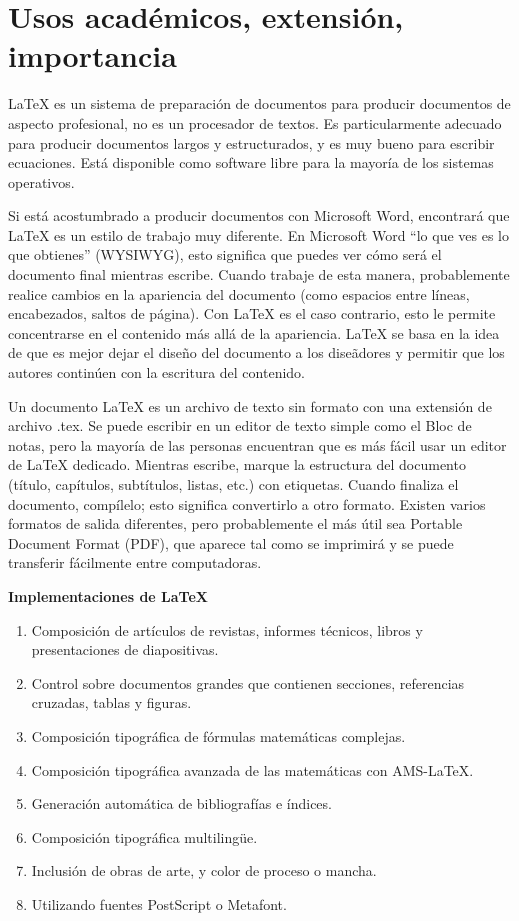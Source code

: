 \documentclass[letterpaper, 10pt, journal]{IEEEtran}
\begin{document}
\section{Usos acad\'emicos, extensi\'on, importancia}
\LaTeX{} es un sistema de preparaci\'on de documentos para producir documentos de aspecto profesional, no es un procesador de textos. Es particularmente adecuado para producir documentos largos y estructurados, y es muy bueno para escribir ecuaciones. Est\'a disponible como software libre para la mayor\'ia de los sistemas operativos.

Si est\'a acostumbrado a producir documentos con Microsoft Word, encontrar\'a que \LaTeX{} es un estilo de trabajo muy diferente. En Microsoft Word \textquotedblleft{}lo que ves es lo que obtienes\textquotedblright{} (WYSIWYG), esto significa que puedes ver c\'omo ser\'a el documento final mientras escribe. Cuando trabaje de esta manera, probablemente realice cambios en la apariencia del documento (como espacios entre l\'ineas, encabezados, saltos de p\'agina). Con \LaTeX{} es el caso contrario, esto le permite concentrarse en el contenido m\'as all\'a de la apariencia. \LaTeX{} se basa en la idea de que es mejor dejar el diseño del documento a los dise\~{a}dores y permitir que los autores contin\'{u}en con la escritura del contenido. \cite{[2]}

Un documento \LaTeX{} es un archivo de texto sin formato con una extensi\'on de archivo .tex. Se puede escribir en un editor de texto simple como el Bloc de notas, pero la mayor\'ia de las personas encuentran que es m\'as f\'acil usar un editor de \LaTeX{} dedicado. Mientras escribe, marque la estructura del documento (t\'itulo, cap\'itulos, subt\'itulos, listas, etc.) con etiquetas. Cuando finaliza el documento, comp\'ilelo; esto significa convertirlo a otro formato. \cite{[2]} Existen varios formatos de salida diferentes, pero probablemente el m\'as \'util sea Portable Document Format (PDF), que aparece tal como se imprimir\'a y se puede transferir f\'acilmente entre computadoras. \cite{[2]}

\textbf{Implementaciones de \LaTeX{}}
\begin{enumerate}
    \item Composici\'on de art\'iculos de revistas, informes t\'ecnicos, libros y presentaciones de diapositivas.
    \item Control sobre documentos grandes que contienen secciones, referencias cruzadas, tablas y figuras.
    \item Composici\'on tipogr\'afica de f\'ormulas matem\'aticas complejas.
    \item Composici\'on tipogr\'afica avanzada de las matem\'aticas con AMS-LaTeX.
    \item Generaci\'on autom\'atica de bibliograf\'ias e \'indices.
    \item Composici\'on tipogr\'afica multiling\"ue.
    \item Inclusi\'on de obras de arte, y color de proceso o mancha.
    \item Utilizando fuentes PostScript o Metafont.
\end{enumerate}
\end{document}
